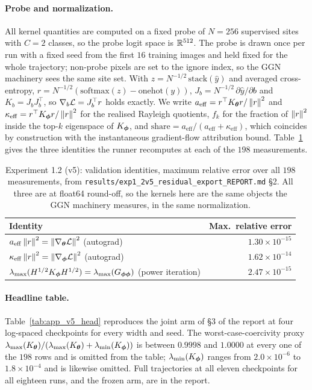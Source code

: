 \paragraph{Probe and normalization.} All kernel quantities are computed on a
fixed probe of $N = 256$ supervised sites with $C = 2$ classes, so the probe
logit space is $\mathbb{R}^{512}$. The probe is drawn once per run with a fixed seed
from the first $16$ training images and held fixed for the whole trajectory;
non-probe pixels are set to the ignore index, so the GGN machinery sees the
same site set. With $z = N^{-1/2}\,\mathrm{stack}(\hat y)$ and averaged
cross-entropy, $r = N^{-1/2}(\mathrm{softmax}(z) - \mathrm{onehot}(y))$,
$J_b = N^{-1/2}\,\partial \hat y/\partial b$ and $K_b = J_bJ_b^\top$, so
$\nabla_b\mathcal{L} = J_b^\top r$ holds exactly. We write
$a_{\mathrm{eff}} = r^\top K_{\boldsymbol{\theta}} r / \left\lVert r\right\rVert^2$ and
$\kappa_{\mathrm{eff}} = r^\top K_{\boldsymbol{\phi}} r / \left\lVert r\right\rVert^2$ for the realised
Rayleigh quotients, $f_k$ for the fraction of $\left\lVert r\right\rVert^2$ inside the top-$k$
eigenspace of $K_{\boldsymbol{\phi}}$, and $\mathrm{share} =
a_{\mathrm{eff}}/(a_{\mathrm{eff}} + \kappa_{\mathrm{eff}})$, which coincides
by construction with the instantaneous gradient-flow attribution bound.
Table~\ref{tab:app_v5_ident} gives the three identities the runner
recomputes at each of the $198$ measurements.

\begin{table}[htbp]
\centering
\caption{Experiment 1.2 (v5): validation identities, maximum relative error
over all $198$ measurements, from
\texttt{results/exp1\_2v5\_residual\_export\_REPORT.md} \S2. All three are at
float64 round-off, so the kernels here are the same objects the GGN machinery
measures, in the same normalization.}
\label{tab:app_v5_ident}
\begin{tabular}{lr}
\toprule
Identity & Max.\ relative error \\
\midrule
$a_{\mathrm{eff}}\left\lVert r\right\rVert^2 = \left\lVert\nabla_{\boldsymbol{\theta}}\mathcal{L}\right\rVert^2$ (autograd) & $1.30 \times 10^{-15}$ \\
$\kappa_{\mathrm{eff}}\left\lVert r\right\rVert^2 = \left\lVert\nabla_{\boldsymbol{\phi}}\mathcal{L}\right\rVert^2$ (autograd) & $1.62 \times 10^{-14}$ \\
$\lambda_{\max}(H^{1/2}K_{\boldsymbol{\phi}} H^{1/2}) = \lambda_{\max}(G_{{\boldsymbol{\phi}}{\boldsymbol{\phi}}})$ (power iteration) & $2.47 \times 10^{-15}$ \\
\bottomrule
\end{tabular}
\end{table}

\paragraph{Headline table.} Table~\ref{tab:app_v5_head} reproduces the joint
arm of \S3 of the report at four log-spaced checkpoints for every width and
seed. The worst-case-coercivity proxy
$\lambda_{\max}(K_{\boldsymbol{\theta}})/(\lambda_{\max}(K_{\boldsymbol{\theta}})+\lambda_{\min}(K_{\boldsymbol{\phi}}))$
is between $0.9998$ and $1.0000$ at every one of the $198$ rows and is omitted
from the table; $\lambda_{\min}(K_{\boldsymbol{\phi}})$ ranges from $2.0 \times 10^{-6}$ to
$1.8 \times 10^{-4}$ and is likewise omitted. Full trajectories at all eleven
checkpoints for all eighteen runs, and the frozen arm, are in the report.

